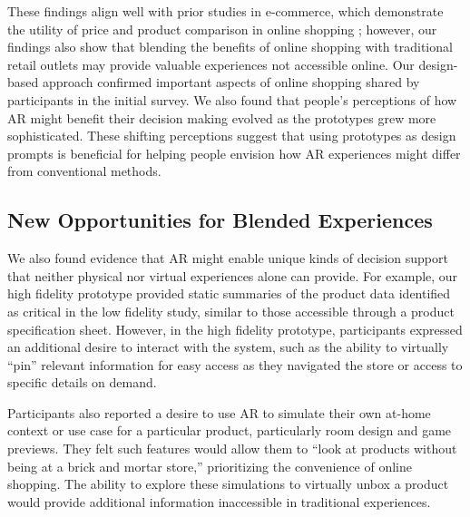 These findings align well with prior studies in e-commerce, which demonstrate the utility of price and product comparison in online shopping ; however, our findings also show that blending the benefits of online shopping with traditional retail outlets may provide valuable experiences not accessible online.  Our design-based approach confirmed important aspects of online shopping shared by participants in the initial survey. We also found that people's perceptions of how AR might benefit their decision making evolved as the prototypes grew more sophisticated. These shifting perceptions suggest that using prototypes as design prompts is beneficial for helping people envision how AR experiences might differ from conventional methods. 

\subsection{New Opportunities for Blended Experiences}
We also found evidence that AR might enable unique kinds of decision support that neither physical nor virtual experiences alone can provide. For example, our high fidelity prototype provided static summaries of the product data identified as critical in the low fidelity study, similar to those accessible through a product specification sheet. However, in the high fidelity prototype, participants expressed an additional desire to interact with the system, such as the ability to virtually ``pin'' relevant information for easy access as they navigated the store or access to specific details on demand. 

Participants also reported a desire to use AR to simulate their own at-home context or use case for a particular product, particularly room design and game previews. They felt such features would allow them to ``look at products without being at a brick and mortar store,'' prioritizing the convenience of online shopping. The ability to explore these simulations to virtually unbox a product would provide additional information inaccessible in traditional experiences.

